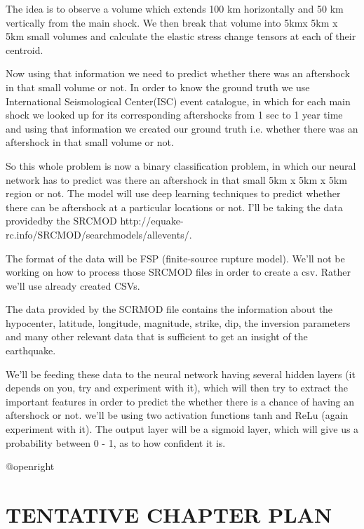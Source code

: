 \documentclass[14pt]{extarticle}
\makeatletter
\newcommand\backmatter{
    \if @openright
        \cleardoublepage
    \else
        \clearpage
    \fi
}
\makeatother
\begin{document}
\par The idea is to observe a volume which extends 100 km horizontally and 50 km vertically from the main shock. We then break that volume into 5kmx 5km x 5km small volumes and calculate the elastic stress change tensors at each of their centroid.
\par Now using that information we need to predict whether there was an aftershock in that small volume or not. In order to know the ground truth we use International Seismological Center(ISC) event catalogue, in which for each main shock we looked up for its corresponding aftershocks from 1 sec to 1 year time and using that information we created our ground truth i.e. whether there was an aftershock in that small volume or not.
\par So this whole problem is now a binary classification problem, in which our neural network has to predict was there an aftershock in that small 5km x 5km x 5km region or not. The model will use deep learning techniques to predict whether there can be aftershock at a particular locations or not. I'll be taking the data providedby the SRCMOD http://equake-rc.info/SRCMOD/searchmodels/allevents/.
\par The format of the data will be FSP (finite-source rupture model). We'll not be working on how to process those SRCMOD files in order to create a csv. Rather we'll use already created CSVs.
\par The data provided by the SCRMOD file contains the information about the hypocenter, latitude, longitude, magnitude, strike, dip, the inversion parameters and many other relevant data that is sufficient to get an insight of the earthquake.
\par We'll be feeding these data to the neural network having several hidden layers (it depends on you, try and experiment with it), which will then try to extract the important features in order to predict the whether there is a chance of having an aftershock or not. we'll be using two activation functions tanh and ReLu (again experiment with it). The output layer will be a sigmoid layer, which will give us a probability between 0 - 1, as to how confident it is.


\backmatter

\newpage
{}
\section*{TENTATIVE CHAPTER PLAN}
\end{document}

